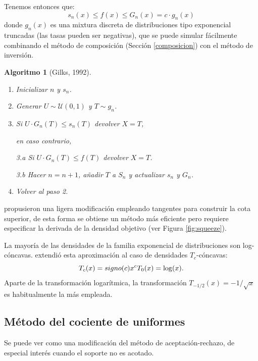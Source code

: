 \documentclass[
  spanish,
  10pt,
]{book}
\theoremstyle{break}
\newtheorem{conjecture}{Algoritmo}[chapter]
\theoremstyle{nonumberplain}
\begin{document}
Tenemos entonces que:
\[s_n(x)\leq f(x) \leq G_n(x)=c\cdot g_n(x)\]
donde \(g_n(x)\) es una mixtura discreta de distribuciones tipo exponencial truncadas (las tasas pueden ser negativas), que se puede simular fácilmente combinando el método de composición (Sección \ref{composicion}) con el método de inversión.

\begin{conjecture}[Gilks, 1992]
\protect\hypertarget{cnj:gilks}{}\label{cnj:gilks}

\begin{enumerate}
\def\labelenumi{\arabic{enumi}.}
\item
  Inicializar \(n\) y \(s_n\).
\item
  Generar \(U \sim \mathcal{U}(0, 1)\) y \(T\sim g_n\).
\item
  Si \(U\cdot G_n(T) \leq s_n(T)\) devolver \(X=T\),

  en caso contrario,

  3.a Si \(U\cdot G_n(T) \leq f(T)\) devolver \(X=T\).

  3.b Hacer \(n=n+1\), añadir \(T\) a \(S_n\) y actualizar \(s_n\) y \(G_n\).
\item
  Volver al paso 2.
\end{enumerate}

\end{conjecture}

\citet{gilks1992} propusieron una ligera modificación empleando tangentes para construir la cota superior, de esta forma se obtiene un método más eficiente pero requiere especificar la derivada de la densidad objetivo (ver Figura \ref{fig:squeeze}).

La mayoría de las densidades de la familia exponencial de distribuciones son log-cóncavas.
\citet{hormann1995} extendió esta aproximación al caso de densidades \(T_{c}\)-cóncavas:
\[T_{c}(x) = signo(c)x^{c} \\ T_{0}(x) = \log (x).\]
Aparte de la transformación logarítmica, la transformación \(T_{-1/2}(x)=-1/\sqrt{x}\) es habitualmente la más empleada.

\subsection{Método del cociente de uniformes}\label{muxe9todo-del-cociente-de-uniformes}

Se puede ver como una modificación del método de aceptación-rechazo, de especial interés cuando el soporte no es acotado.
\end{document}
